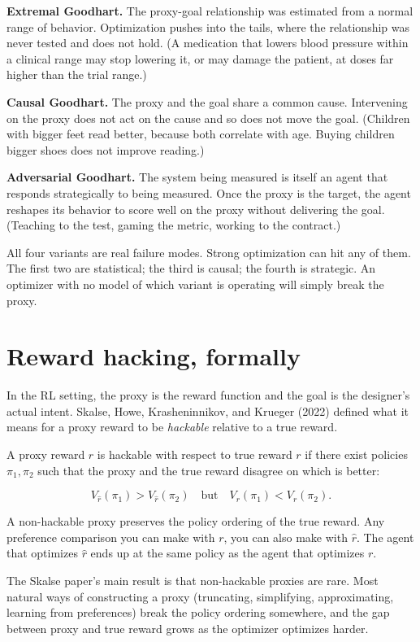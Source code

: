 \textbf{Extremal Goodhart.} The proxy-goal relationship was estimated from a normal range of behavior. Optimization pushes into the tails, where the relationship was never tested and does not hold. (A medication that lowers blood pressure within a clinical range may stop lowering it, or may damage the patient, at doses far higher than the trial range.)

\textbf{Causal Goodhart.} The proxy and the goal share a common cause. Intervening on the proxy does not act on the cause and so does not move the goal. (Children with bigger feet read better, because both correlate with age. Buying children bigger shoes does not improve reading.)

\textbf{Adversarial Goodhart.} The system being measured is itself an agent that responds strategically to being measured. Once the proxy is the target, the agent reshapes its behavior to score well on the proxy without delivering the goal. (Teaching to the test, gaming the metric, working to the contract.)

All four variants are real failure modes. Strong optimization can hit any of them. The first two are statistical; the third is causal; the fourth is strategic. An optimizer with no model of which variant is operating will simply break the proxy.

\section*{Reward hacking, formally}

In the RL setting, the proxy is the reward function and the goal is the designer's actual intent. Skalse, Howe, Krasheninnikov, and Krueger (2022) defined what it means for a proxy reward to be \emph{hackable} relative to a true reward.

A proxy reward $\hat{r}$ is hackable with respect to true reward $r$ if there exist policies $\pi_1, \pi_2$ such that the proxy and the true reward disagree on which is better:

$$V_{\hat{r}}(\pi_1) > V_{\hat{r}}(\pi_2) \quad \text{but} \quad V_r(\pi_1) < V_r(\pi_2).$$

A non-hackable proxy preserves the policy ordering of the true reward. Any preference comparison you can make with $r$, you can also make with $\hat{r}$. The agent that optimizes $\hat{r}$ ends up at the same policy as the agent that optimizes $r$.

The Skalse paper's main result is that non-hackable proxies are rare. Most natural ways of constructing a proxy (truncating, simplifying, approximating, learning from preferences) break the policy ordering somewhere, and the gap between proxy and true reward grows as the optimizer optimizes harder.

